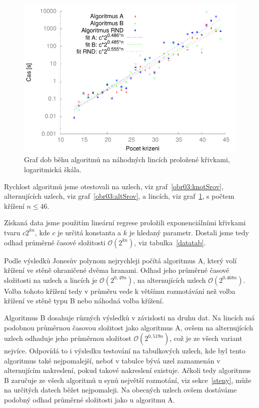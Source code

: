 \begin{figure}[p]\centering
\includegraphics{../img/linksFIT}
\caption{Graf dob běhu algoritmů na náhodných lincích proložené křivkami, logaritmická škála.}
\label{obr03:linkSrov}
\end{figure}

Rychlost algoritmů jsme otestovali na uzlech, viz graf~\ref{obr03:knotSrov}, alternujících uzlech, viz graf~\ref{obr03:altSrov}, a lincích, viz graf~\ref{obr03:linkSrov}, s počtem křížení $n \leq 46$. 

Získaná data jsme použitím lineární regrese proložili exponenciálními křivkami tvaru $c 2^{kn}$, kde $c$ je určitá  konstanta a $k$ je hledaný parametr. Dostali jsme tedy odhad průměrné časové složitosti $\mathcal{O}(2^{kn})$, viz tabulka~\ref{datatab}.

Podle výsledků Jonesův polynom nejrychleji počítá algoritmus A, který volí křížení ve stěně ohraničené dvěma hranami. Odhad jeho průměrné časové složitosti na uzlech a lincích je $\mathcal{O}(2^{0,49n})$, na alternujících uzlech $\mathcal{O}(2^{0.468 n})$. Volba tohoto křížení tedy v průměru vede k většímu rozmotávání než volba křížení ve stěně typu B nebo náhodná volba křížení. 

Algoritmus B dosahuje různých výsledků v závislosti na druhu dat. Na lincích má podobnou průměrnou časovou složitost jako algoritmus A, ovšem na alternujících uzlech odhaduje jeho průměrnou složitost $\mathcal{O}(2^{0,519 n})$, což je ze všech variant nejvíce. Odpovídá to i výsledku testování na tabulkových uzlech, kde byl tento algoritmus také nejpomalejší, neboť v tabulce bývá uzel zaznamenán v alternujícím nakreslení, pokud takové nakreslení existuje. Ačkoli tedy algoritmus B zaručuje ze všech algoritmů u synů největší rozmotání, viz sekce~\ref{steny}, může na určitých datech běžet nejpomaleji. Na obecných uzlech ovšem dostáváme podobný odhad průměrné složitosti jako u algoritmu A.

